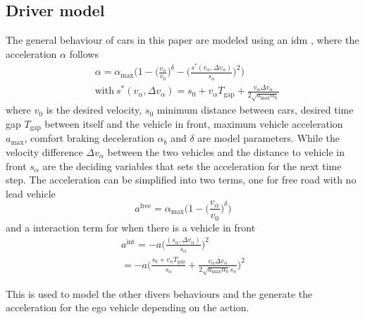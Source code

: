 	\subsection{Driver model}
	\label{sec:driver_model}
	The general behaviour of cars in this paper are modeled using an \gls{idm} \cite{idm2000}, where the acceleration $\alpha$ follows 
	\begin{align*}
		& \alpha = \alpha_{\mathrm{max}}\Big(1-\Big(\frac{v_\alpha}{v_0}\Big)^\delta-\Big( \frac{s^*(v_\alpha,\Delta v_\alpha)}{s_\alpha}\Big)^2\Big) \\
		& \mathrm{with ~} s^*(v_\alpha, \Delta v_\alpha) = s_0 + v_\alpha T_{\mathrm{gap}} + \frac{v_\alpha \Delta v_\alpha}{2 \sqrt{a_{\mathrm{max}} \alpha_b}}
	\end{align*}
	where $v_0$ is the desired velocity, $s_0$ minimum distance between cars, desired time gap $T_{\mathrm{gap}}$ between itself and the vehicle in front, maximum vehicle acceleration $a_\mathrm{max}$, comfort braking deceleration $\alpha_b$ and $\delta$ are model parameters. While the velocity difference $\Delta v_\alpha$  between the two vehicles and the distance to vehicle in front $s_\alpha$ are the deciding variables that sets the acceleration for the next time step. 
	The acceleration can be simplified into two terms, one for free road with no lead vehicle
	\begin{equation}
		a^\text{free}= \alpha_\mathrm{max}\Big(1-\Big(\frac{v_\alpha}{v_0}\Big)^\delta\Big)
		\label{eq:idm_free}
	\end{equation}
	and a interaction term for when there is a vehicle in front 
	\begin{align}
		 a^\text{int} = -a \Big(\frac{(s_\alpha,\Delta v_\alpha)}{s_\alpha} \Big) ^2 
		 \\= -a \Big(\frac{s_0 + v_\alpha T_{\mathrm{gap}}}{s_\alpha} + \frac{v_\alpha \Delta v_\alpha}{2 \sqrt{a_{\mathrm{max}} \alpha_b} s_\alpha} \Big) ^2
		 \label{eq:idm_int}
	\end{align}
	
	This is used to model the other divers behaviours and the generate the acceleration for the ego vehicle depending on the action.
	
